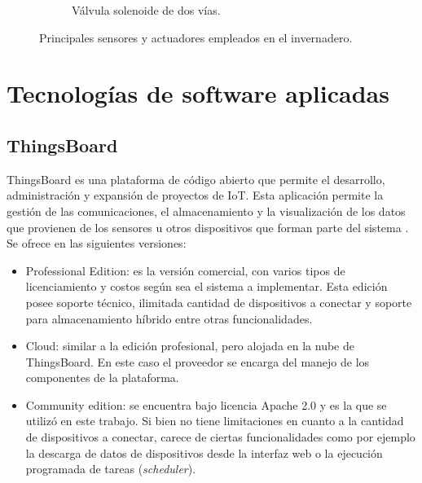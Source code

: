 \begin{figure}[!htpb]
\begin{subfigure}[b]{0.3\textwidth}
         \caption{Válvula solenoide de dos vías.}
         \label{fig:valve}
     \end{subfigure}
        \caption[Principales sensores y actuadores empleados en el invernadero]{Principales sensores y actuadores empleados en el invernadero.}
        \label{fig:sensores}
\end{figure}




\section{Tecnologías de software aplicadas}
\label{sec:Software aplicado}
\subsection{ThingsBoard}
\label{sec:ThingsBoard}
ThingsBoard es una plataforma de código abierto que permite el desarrollo, administración y expansión de proyectos de IoT. Esta aplicación permite la gestión de las comunicaciones, el almacenamiento y la visualización de los datos que provienen de los sensores u otros dispositivos que forman parte del sistema \citep{thingsboard:1}.
Se ofrece en las siguientes versiones:
\begin{itemize}

\item Professional Edition: es la versión comercial, con varios tipos de licenciamiento y costos según sea el sistema a implementar. Esta edición posee soporte técnico, ilimitada cantidad de dispositivos a conectar y soporte para almacenamiento híbrido entre otras funcionalidades.

\item Cloud: similar a la edición profesional, pero alojada en la nube de ThingsBoard. En este caso el proveedor se encarga del manejo de los componentes de la plataforma.
 
\item Community edition: se encuentra bajo licencia Apache 2.0 \citep{apache2.0} y  es la que se utilizó en este trabajo. Si bien no tiene limitaciones en cuanto a la cantidad de dispositivos a conectar, carece de ciertas funcionalidades como por ejemplo la descarga de datos de dispositivos desde la interfaz web o la ejecución programada de tareas (\textit{scheduler}).
\end{itemize}
%

